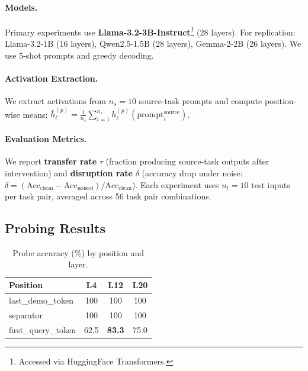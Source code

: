 \documentclass[11pt]{article}
\begin{document}
\paragraph{Models.} Primary experiments use \textbf{Llama-3.2-3B-Instruct}\footnote{Accessed via HuggingFace Transformers.} (28 layers). For replication: Llama-3.2-1B (16 layers), Qwen2.5-1.5B \citep{bai2023qwen} (28 layers), Gemma-2-2B \citep{team2024gemma} (26 layers). We use 5-shot prompts and greedy decoding.

\paragraph{Activation Extraction.} We extract activations from $n_s = 10$ source-task prompts and compute position-wise means: $\bar{h}_\ell^{(p)} = \frac{1}{n_s} \sum_{i=1}^{n_s} h_\ell^{(p)}(\text{prompt}_i^{\text{source}})$.

\paragraph{Evaluation Metrics.} We report \textbf{transfer rate} $\tau$ (fraction producing source-task outputs after intervention) and \textbf{disruption rate} $\delta$ (accuracy drop under noise: $\delta = (\text{Acc}_{\text{clean}} - \text{Acc}_{\text{noised}}) / \text{Acc}_{\text{clean}}$). Each experiment uses $n_t = 10$ test inputs per task pair, averaged across 56 task pair combinations.

\subsection{Probing Results}

\begin{table}
\vspace{-12pt}
\centering
\small
\caption{Probe accuracy (\%) by position and layer.}
\label{tab:probing}
\begin{tabular}{@{}lccc@{}}
\toprule
Position & L4 & L12 & L20 \\
\midrule
last\_demo\_token & 100 & 100 & 100 \\
separator & 100 & 100 & 100 \\
first\_query\_token & 62.5 & \textbf{83.3} & 75.0 \\
\bottomrule
\end{tabular}
\vspace{-10pt}
\end{table}
\end{document}
